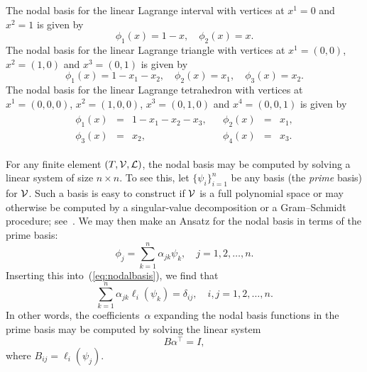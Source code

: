 \begin{example}
  The nodal basis for the linear Lagrange interval with vertices at
  $x^1 = 0$ and $x^2 = 1$ is given by
  \begin{equation}
    \phi_1(x) = 1 - x, \quad
    \phi_2(x) = x.
  \end{equation}
  The nodal basis for the linear Lagrange triangle with vertices at
  $x^1 = (0, 0)$, $x^2 = (1, 0)$ and $x^3 = (0, 1)$ is given by
  \begin{equation}
    \phi_1(x) = 1 - x_1 - x_2, \quad
    \phi_2(x) = x_1, \quad
    \phi_3(x) = x_2.
  \end{equation}
  The nodal basis for the linear Lagrange tetrahedron with vertices at
  $x^1 = (0, 0, 0)$, $x^2 = (1, 0, 0)$, $x^3 = (0, 1, 0)$ and $x^4 =
  (0, 0, 1)$ is given by
  \begin{equation}
    \begin{array}{cc}
      \begin{array}{rcl}
        \phi_1(x) &=& 1 - x_1 - x_2 - x_3, \\
        \phi_3(x) &=& x_2,
      \end{array}
      &
      \begin{array}{rcl}
        \phi_2(x) &=& x_1, \\
        \phi_4(x) &=& x_3.
      \end{array}
    \end{array}
  \end{equation}
\end{example}

For any finite element $(T, \mathcal{V}, \mathcal{L})$, the nodal
basis may be computed by solving a linear system of size $n \times
n$. To see this, let $\{\psi_i\}_{i=1}^{n}$ be any basis (the
\emph{prime} basis) for $\mathcal{V}$. Such a basis is easy to
construct if $\mathcal{V}$ is a full polynomial space or may
otherwise be computed by a singular-value decomposition or a
Gram--Schmidt procedure; see~\citet{Kirby2004}. We may then make an
Ansatz for the nodal basis in terms of the prime basis:
\begin{equation}
  \phi_j = \sum_{k=1}^{n} \alpha_{jk} \psi_k, \quad j = 1,2,\ldots,n.
\end{equation}
Inserting this into~(\ref{eq:nodalbasis}), we find that
\begin{equation}
  \sum_{k=1}^{n} \alpha_{jk} \ell_i(\psi_k) = \delta_{ij}, \quad i, j = 1,2,\ldots,n.
\end{equation}
In other words, the coefficients~$\alpha$ expanding the nodal basis
functions in the prime basis may be computed by solving the linear
system
\begin{equation}
  B \alpha^{\top} = I,
\end{equation}
where $B_{ij} = \ell_i(\psi_j)$.

